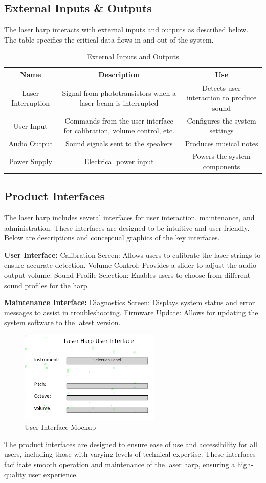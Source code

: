 \subsection{External Inputs \& Outputs}
The laser harp interacts with external inputs and outputs as described below. The table specifies the critical data flows in and out of the system.

\begin{table}[H]
\centering
\begin{tabular}{|c|c|c|}
\hline
\textbf{Name} & \textbf{Description} & \textbf{Use} \\ \hline
Laser Interruption & Signal from phototransistors when a laser beam is interrupted & Detects user interaction to produce sound \\ \hline
User Input & Commands from the user interface for calibration, volume control, etc. & Configures the system settings \\ \hline
Audio Output & Sound signals sent to the speakers & Produces musical notes \\ \hline
Power Supply & Electrical power input & Powers the system components \\ \hline
\end{tabular}
\caption{External Inputs and Outputs}
\end{table}

\subsection{Product Interfaces}
The laser harp includes several interfaces for user interaction, maintenance, and administration. These interfaces are designed to be intuitive and user-friendly. Below are descriptions and conceptual graphics of the key interfaces.

\textbf{User Interface:}
Calibration Screen: Allows users to calibrate the laser strings to ensure accurate detection.
Volume Control: Provides a slider to adjust the audio output volume.
Sound Profile Selection: Enables users to choose from different sound profiles for the harp.

\textbf{Maintenance Interface:}
Diagnostics Screen: Displays system status and error messages to assist in troubleshooting.
Firmware Update: Allows for updating the system software to the latest version.

\begin{figure}[h!]
	\centering
   	\includegraphics[width=0.60\textwidth]{images/UI}
    \caption{User Interface Mockup}
\end{figure}

The product interfaces are designed to ensure ease of use and accessibility for all users, including those with varying levels of technical expertise. These interfaces facilitate smooth operation and maintenance of the laser harp, ensuring a high-quality user experience.
